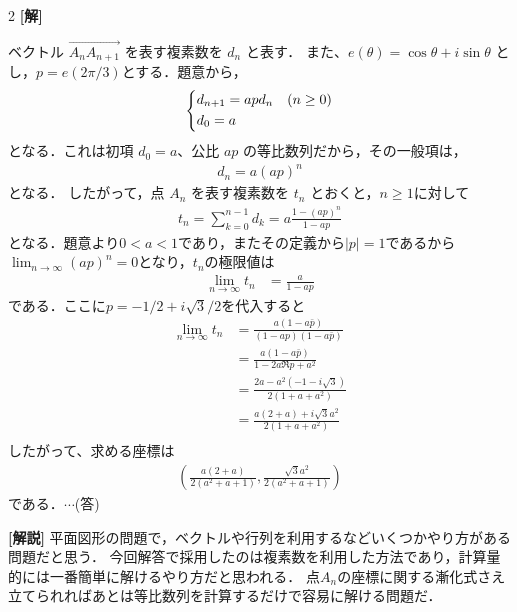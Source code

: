 \documentclass[../../main.tex]{subfiles}
\begin{document}
\setcounter{equation}{0}
\setcounter{figure}{0}
\setcounter{table}{0}
\begin{oframed}
  
\end{oframed}
\setlength{\columnseprule}{0.4pt}
\begin{multicols}{2}
  {\bf[解]}


  ベクトル $\vec{A_n A_{n+1}}$ を表す複素数を $d_n$ と表す．
  また、$e(\theta) = \cos\theta + i\sin\theta$ とし，$p=e(2\pi/3)$とする．題意から，
  \begin{align*}
    \begin{dcases}
      d_{n+1} = a p d_n & (n \ge 0) \\
      d_0 = a           &
    \end{dcases}
  \end{align*}
  となる．これは初項 $d_0 = a$、公比 $ap$ の等比数列だから，その一般項は，
  \begin{align*}
    d_n = a(ap)^n
  \end{align*}
  となる．
  したがって，点 $A_n$ を表す複素数を $t_n$ とおくと，$n\ge 1$に対して
  \begin{align}
    t_n = \sum_{k=0}^{n-1} d_k = a \frac{1-(ap)^n}{1-ap}
  \end{align}
  となる．題意より$0<a<1$であり，またその定義から$|p|=1$であるから
  $\lim_{n \to \infty} (ap)^n = 0$となり，$t_n$の極限値は
  \begin{align*}
    \lim_{n \to \infty} t_n & = \frac{a}{1-ap}
  \end{align*}
  である．ここに$p=-1/2+i\sqrt{3}/2$を代入すると
  \begin{align*}
    \lim_{n \to \infty} t_n
     & = \frac{a(1-a\bar{p})}{(1-ap)(1-a\bar{p})}  \\
     & = \frac{a(1-a\bar{p})}{1-2a\Re p + a^2}     \\
     & = \frac{2a-a^2(-1-i\sqrt{3})}{2(1+a + a^2)} \\
     & = \frac{a(2+a)+i\sqrt{3}a^2}{2(1+a + a^2)}  \\
  \end{align*}
  したがって、求める座標は
  \begin{align*}
    \left( \frac{a(2+a)}{2(a^2+a+1)}, \frac{\sqrt{3}a^2}{2(a^2+a+1)} \right)
  \end{align*}
  である．$\cdots$(答)

  \vspace{10pt}
  {\bf[解説]}
  平面図形の問題で，ベクトルや行列を利用するなどいくつかやり方がある問題だと思う．
  今回解答で採用したのは複素数を利用した方法であり，計算量的には一番簡単に解けるやり方だと思われる．
  点$A_n$の座標に関する漸化式さえ立てられればあとは等比数列を計算するだけで容易に解ける問題だ．


\end{multicols}
\end{document}
